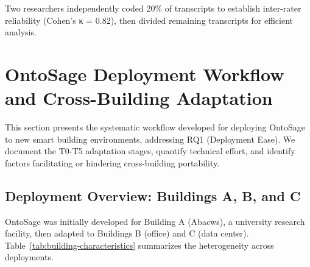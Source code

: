 \documentclass[acmlarge]{acmart}
\begin{document}
Two researchers independently coded 20\% of transcripts to establish inter-rater reliability (Cohen's κ = 0.82), then divided remaining transcripts for efficient analysis.


\section{OntoSage Deployment Workflow and Cross-Building Adaptation}
\label{sec:deployment}

This section presents the systematic workflow developed for deploying OntoSage to new smart building environments, addressing RQ1 (Deployment Ease). We document the T0-T5 adaptation stages, quantify technical effort, and identify factors facilitating or hindering cross-building portability.

\subsection{Deployment Overview: Buildings A, B, and C}

OntoSage was initially developed for Building A (Abacws), a university research facility, then adapted to Buildings B (office) and C (data center). Table~\ref{tab:building-characteristics} summarizes the heterogeneity across deployments.
\end{document}
